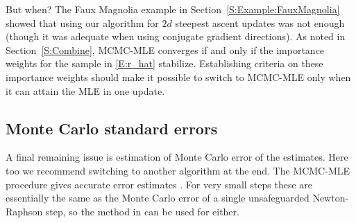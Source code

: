 But when?  
The Faux Magnolia example in Section~\ref{S:Example:FauxMagnolia} showed that using 
our algorithm for $2d$ steepest ascent updates was not enough (though it was adequate when
 using conjugate gradient directions).
As noted in Section~\ref{S:Combine}, MCMC-MLE converges if and only 
if the importance weights for the sample in \eqref{E:r_hat} stabilize.  Establishing criteria on these importance weights should make it 
possible to switch to MCMC-MLE only when it can attain the MLE in one update.

\subsection{Monte Carlo standard errors}
 A final remaining issue is estimation of Monte Carlo error of the estimates.  
 Here too we recommend switching to another
algorithm at the end.  The MCMC-MLE procedure gives accurate error estimates \citep{Geyer:1994,Hunter:2006}.
For very small steps these are essentially the same as the Monte Carlo error of a single unsafeguarded Newton-Raphson step,
so the method in \citep{Geyer:1994} can be used for either.




